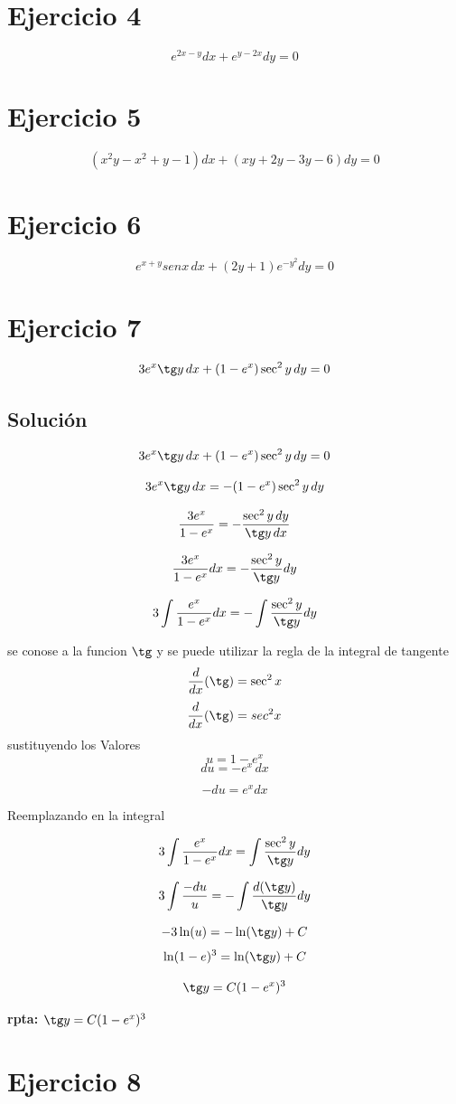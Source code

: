 \documentclass[12pt,a4paper]{article}
\begin{document}
\begin{multicols}{2}
\section*{Ejercicio 4}
\[e^{2x-y}dx+e^{y-2x}dy=0\]

\section*{Ejercicio 5}
\[(x^2y-x^2+y-1)dx+(xy+2y-3y-6)dy=0\]

\section*{Ejercicio 6}
\[e^{x+y}senx \, dx+(2y+1)e^{-y^2}dy=0\]


\section*{Ejercicio 7} \[3e^x\tg y \, dx+(1-e^x)\sec^2 y \, dy=0\] 
\subsection*{Solución} 
\[3e^x\tg y \, dx+(1-e^x)\sec^2 y \, dy=0\] 

\[3e^x\tg y\,dx=-(1-e^x)\sec^2 y\,dy\] 

\[\frac{3e^x}{1-e^x}=-\frac{\sec^2 y\,dy}{\tg y\,dx}\] 

\[\frac{3e^x}{1-e^x}dx=-\frac{\sec^2 y}{\tg y}dy\] 

\[3\int\frac{e^x}{1-e^x}dx=-\int\frac{\sec^2 y}{\tg y}dy\]  

se conose a la funcion $\tg$ y se puede utilizar la regla de la integral de tangente \[\frac{d}{dx}(\tg)=\sec^2x\]
\[\frac{d}{dx}(\tg)=sec^2x\] 
sustituyendo los Valores \[u=1-e^x\] \[du=-e^x\,dx\] 

\[-du=e^xdx\]

Reemplazando en la integral 

\[3\int\frac{e^x}{1-e^x}dx=\int\frac{\sec^2 y}{\tg y}dy\] 

\[3\int\frac{-du}{u}=-\int\frac{d(\tg y)}{\tg y}dy\] 

\[-3\ln(u)=-\ln(\tg y)+C\] \[\ln(1-e)^3=\ln(\tg y)+C\] 

\[\tg y=C(1-e^x)^3\] 

\textbf{rpta: $\tg y=C(1-e^x)^3$}

\section*{Ejercicio 8}

\end{multicols}
\end{document}
